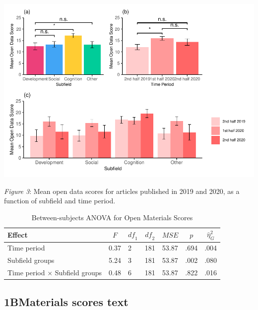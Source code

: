 \documentclass[
  english,
  man]{apa6}
\begin{document}
\includegraphics{icd_special_issue_files/figure-latex/1B-d-plots-1.pdf}

\emph{Figure 3}: Mean open data scores for articles published in 2019 and 2020, as a function of subfield and time period.

\begin{table}[tbp]

\begin{center}
\begin{threeparttable}

\caption{\label{tab:1B-m-anova}Between-subjects ANOVA for Open Materials Scores}

\begin{tabular}{lllllll}
\toprule
Effect & \multicolumn{1}{c}{$F$} & \multicolumn{1}{c}{$\mathit{df}_1$} & \multicolumn{1}{c}{$\mathit{df}_2$} & \multicolumn{1}{c}{$\mathit{MSE}$} & \multicolumn{1}{c}{$p$} & \multicolumn{1}{c}{$\hat{\eta}^2_G$}\\
\midrule
Time period & 0.37 & 2 & 181 & 53.87 & .694 & .004\\
Subfield groups & 5.24 & 3 & 181 & 53.87 & .002 & .080\\
Time period $\times$ Subfield groups & 0.48 & 6 & 181 & 53.87 & .822 & .016\\
\bottomrule
\end{tabular}

\end{threeparttable}
\end{center}

\end{table}

\hypertarget{bmaterials-scores-text}{%
\subsection{1BMaterials scores text}\label{bmaterials-scores-text}}
\end{document}
